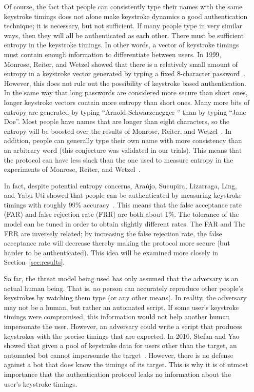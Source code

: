 \documentclass[11pt]{article}
\begin{document}
Of course, the fact that people can consistently type their names with the same keystroke timings does not alone make keystroke dynamics a good authentication technique; it is necessary, but not sufficient. If many people type in very similar ways, then they will all be authenticated as each other. There must be sufficient entropy in the keystroke timings. In other words, a vector of keystroke timings must contain enough information to differentiate between users. In 1999, Monrose, Reiter, and Wetzel showed that there is a relatively small amount of entropy in a keystroke vector generated by typing a fixed 8-character password~\cite{Monrose:1999:PHB:319709.319720}. However, this does not rule out the possibility of keystroke based authentication. In the same way that long passwords are considered more secure than short ones, longer keystroke vectors contain more entropy than short ones. Many more bits of entropy are generated by typing ``Arnold Schwarzenegger
'' than by typing ``Jane Doe''. Most people have names that are longer than eight characters, so the entropy will be boosted over the results of Monrose, Reiter, and Wetzel~\cite{Monrose:1999:PHB:319709.319720}. In addition, people can generally type their own name with more consistency than an arbitrary word (this conjecture was validated in our trials). This means that the protocol can have less slack than the one used to measure entropy in the experiments of Monrose, Reiter, and Wetzel~\cite{Monrose:1999:PHB:319709.319720}.

In fact, despite potential entropy concerns, Ara\'ujo, Sucupira, Lizarraga, Ling, and Yabu-Uti showed that people can be authenticated by measuring keystroke timings with roughly 99\% accuracy~\cite{Araujo:2005:UAT:2197882.2199456}. This means that the false acceptance rate (FAR) and false rejection rate (FRR) are both about 1\%. The tolerance of the model can be tuned in order to obtain slightly different rates. The FAR and The FRR are inversely related; by increasing the false rejection rate, the false acceptance rate will decrease thereby making the protocol more secure (but harder to be authenticated). This idea will be examined more closely in Section~\ref{sec:results}.

So far, the threat model being used has only assumed that the adversary is an actual human being. That is, no person can accurately reproduce other people's keystrokes by watching them type (or any other means). In reality, the adversary may not be a human, but rather an automated script. If some user's keystroke timings were compromised, this information would not help another human impersonate the user. However, an adversary could write a script that produces keystrokes with the precise timings that are expected. In 2010, Stefan and Yao showed that given a pool of keystroke data for users other than the target, an automated bot cannot impersonate the target~\cite{conf/colcom/StefanY10}. However, there is no defense against a bot that does know the timings of its target. This is why it is of utmost importance that the authentication protocol leaks no information about the user's keystroke timings.
\end{document}
